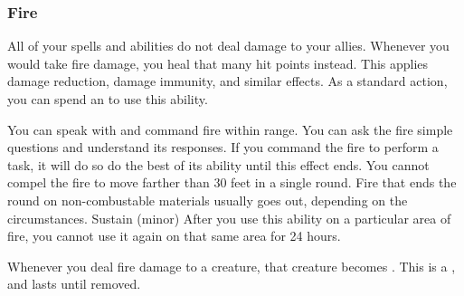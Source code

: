         \subsubsection{Fire}
             All of your  spells and abilities do not deal damage to your allies.
             Whenever you would take fire damage, you heal that many hit points instead.
            This applies damage reduction, damage immunity, and similar effects.
             As a standard action, you can spend an  to use this ability.
            \begin{ability}
                \begin{spelltargetinginfo}
                    \spellrng{\rnglong}
                \end{spelltargetinginfo}
                \begin{spelleffects}
                    \spelleffect You can speak with and command fire within range.
                    You can ask the fire simple questions and understand its responses.
                    If you command the fire to perform a task, it will do so do the best of its ability until this effect ends.
                    You cannot compel the fire to move farther than 30 feet in a single round.
                    Fire that ends the round on non-combustable materials usually goes out, depending on the circumstances.
                    \spelldur Sustain (minor)
                    \spellspecial After you use this ability on a particular area of fire, you cannot use it again on that same area for 24 hours.
                \end{spelleffects}
            \end{ability}
             Whenever you deal fire damage to a creature, that creature becomes \ignited.
            This is a , and lasts until removed.

